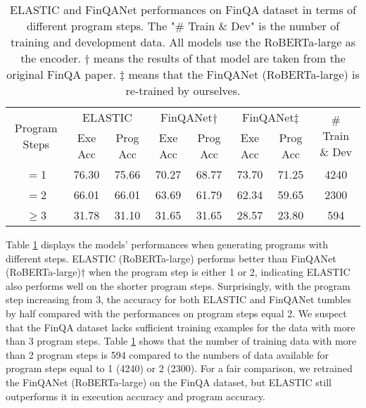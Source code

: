 \documentclass{article}
\begin{document}
\begin{table}[tbhp!]
\caption{ELASTIC and FinQANet performances on FinQA dataset in terms of different program steps. The "\# Train \& Dev" is the number of training and development data.  All models use the RoBERTa-large as the encoder. 
\(\dag\) means the results of that model are taken from the original FinQA \cite{finqa} paper. 
\(\ddagger\) means that the FinQANet (RoBERTa-large) is re-trained by ourselves.\\}
\label{tab:ProgramSteps_FinQA}
\centering
\begin{small}
\begin{tabular}{@{}cccccccc@{}}
\toprule
\multirow{2}{*}{Program Steps} & \multicolumn{2}{c}{ELASTIC} & \multicolumn{2}{c}{FinQANet\(\dag\)} & \multicolumn{2}{c}{FinQANet\(\ddagger\)} & \multirow{2}{*}{\# Train \& Dev} \\ \cmidrule(lr){2-7}
  & Exe Acc & Prog Acc & Exe Acc & Prog Acc & Exe Acc & Prog Acc &      \\ \midrule
\(=\)1 & 76.30   & 75.66    & 70.27   & 68.77    & 73.70   & 71.25    & 4240 \\ \midrule
\(=\)2 & 66.01   & 66.01    & 63.69   & 61.79    & 62.34   & 59.65    & 2300 \\ \midrule
\(\geq\)3 & 31.78   & 31.10    & 31.65   & 31.65    & 28.57   & 23.80    & 594  \\ \bottomrule 
\end{tabular}
\end{small}
\end{table}


Table \ref{tab:ProgramSteps_FinQA} displays the models' performances when generating programs with different steps. ELASTIC (RoBERTa-large) performs better than FinQANet (RoBERTa-large)\(\dag\) when the program step is either 1 or 2, indicating ELASTIC also performs well on the shorter program steps. Surprisingly, with the program step increasing from 3, the accuracy for both ELASTIC and FinQANet tumbles by half compared with the performances on program steps equal 2. We suspect that the FinQA dataset lacks sufficient training examples for the data with more than 3 program steps. Table \ref{tab:ProgramSteps_FinQA} shows that the number of training data with more than 2 program steps is 594 compared to the numbers of data available for program steps equal to 1 (4240) or 2 (2300). For a fair comparison, we retrained the FinQANet (RoBERTa-large) on the FinQA dataset, but ELASTIC still outperforms it in execution accuracy and program accuracy.
\end{document}
